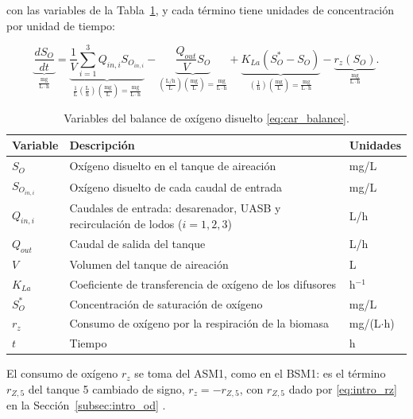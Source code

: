 con las variables de la Tabla~\ref{tab:car_variables}, y cada término tiene unidades de concentración
por unidad de tiempo:

\begin{equation}
\underbrace{\frac{dS_O}{dt}}_{\frac{\mathrm{mg}}{\mathrm{L}\cdot\mathrm{h}}}
=
\underbrace{\frac{1}{V}\sum_{i=1}^3 Q_{in,i}S_{O_{in,i}}}_{\frac{1}{\mathrm{L}}
\left(\frac{\mathrm{L}}{\mathrm{h}}\right)
\left(\frac{\mathrm{mg}}{\mathrm{L}}\right)
=
\frac{\mathrm{mg}}{\mathrm{L}\cdot\mathrm{h}}}
-
\underbrace{\frac{Q_{out}}{V}S_O}_{\left(\frac{\mathrm{L}/\mathrm{h}}{\mathrm{L}}\right)
\left(\frac{\mathrm{mg}}{\mathrm{L}}\right)
=
\frac{\mathrm{mg}}{\mathrm{L}\cdot\mathrm{h}}}
+
\underbrace{K_{La}(S^{*}_O-S_O)}_{\left(\frac{1}{\mathrm{h}}\right)
\left(\frac{\mathrm{mg}}{\mathrm{L}}\right)
=
\frac{\mathrm{mg}}{\mathrm{L}\cdot\mathrm{h}}}
-
\underbrace{r_z(S_O)}_{\frac{\mathrm{mg}}{\mathrm{L}\cdot\mathrm{h}}}.
\label{ecu:nonlineal}
\end{equation}

\begin{table}[H]
\centering
\caption{Variables del balance de oxígeno disuelto \eqref{eq:car_balance}.}
\label{tab:car_variables}
\renewcommand{\arraystretch}{1.2}
\small
\begin{tabular}{@{}l>{\raggedright\arraybackslash}p{9.2cm}l@{}}
\toprule
\textbf{Variable} & \textbf{Descripción} & \textbf{Unidades} \\
\midrule
$S_O$ & Oxígeno disuelto en el tanque de aireación & mg/L \\
$S_{O_{in,i}}$ & Oxígeno disuelto de cada caudal de entrada & mg/L \\
$Q_{in,i}$ & Caudales de entrada: desarenador, UASB y recirculación de lodos ($i = 1, 2, 3$) & L/h \\
$Q_{out}$ & Caudal de salida del tanque & L/h \\
$V$ & Volumen del tanque de aireación & L \\
$K_{La}$ & Coeficiente de transferencia de oxígeno de los difusores & h$^{-1}$ \\
$S^{*}_O$ & Concentración de saturación de oxígeno & mg/L \\
$r_z$ & Consumo de oxígeno por la respiración de la biomasa & mg/(L$\cdot$h) \\
$t$ & Tiempo & h \\
\bottomrule
\end{tabular}
\end{table}

El consumo de oxígeno $r_z$ se toma del ASM1, como en el BSM1: es el término $r_{Z,5}$ del
tanque 5 cambiado de signo, $r_z = -r_{Z,5}$, con $r_{Z,5}$ dado por \eqref{eq:intro_rz} en la
Sección~\ref{subsec:intro_od} \cite{henze1987asm1,alex2008bsm1}.



